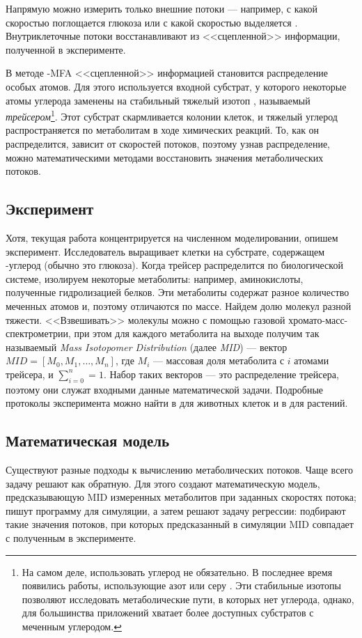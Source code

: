 \documentclass[a4paper, 12pt, left=30mm, right=15mm, top=20mm, bottom=20mm]{report}
\begin{document}
Напрямую можно измерить только внешние потоки --- например, с какой скоростью поглощается глюкоза или с какой скоростью выделяется . Внутриклеточные потоки восстанавливают из <<сцепленной>> информации, полученной в эксперименте. 

В методе -MFA <<сцепленной>> информацией становится распределение особых атомов. Для этого используется входной субстрат, у которого некоторые атомы углерода заменены на стабильный тяжелый изотоп , называемый \emph{трейсером}\footnote{На самом деле, использовать углерод не обязательно. В последнее время появились работы, использующие  азот \cite{nitrogen_mfa} или  серу \cite{sulfur_mfa}. Эти стабильные изотопы позволяют исследовать метаболические пути, в которых нет углерода, однако, для большинства приложений хватает более доступных субстратов с меченным углеродом.}. 
Этот субстрат скармливается колонии клеток, и тяжелый углерод распространяется по метаболитам в ходе химических реакций. То, как он распределится, зависит от скоростей потоков, поэтому узнав распределение, можно математическими методами восстановить значения метаболических потоков.

\subsection{Эксперимент}
Хотя, текущая работа концентрируется на численном моделировании, опишем эксперимент\cite[стр. 312]{protocol}. Исследователь выращивает клетки на субстрате, содержащем -углерод (обычно это глюкоза). Когда трейсер распределится по биологической системе, изолируем некоторые метаболиты: например, аминокислоты, полученные гидролизацией белков. Эти метаболиты содержат разное количество меченных атомов и, поэтому отличаются по массе. Найдем долю молекул разной тяжести. <<Взвешивать>> молекулы можно с помощью газовой хромато-масс-спектрометрии, при этом для каждого метаболита на выходе получим так называемый \emph{Mass Isotopomer Distribution} (далее \emph{MID}) --- вектор $M\!I\!D = [M_0, M_1, \ldots, M_n]$, где $M_i$ --- массовая доля метаболита с $i$ атомами трейсера, и $\sum_{i = 0}^{n} = 1$. Набор таких векторов --- это распределение трейсера, поэтому они служат входными данные математической задачи. Подробные протоколы эксперимента можно найти в \cite{protocol_animal} для животных клеток и в \cite{protocol_plant} для растений.

\subsection{Математическая модель}
Существуют разные подходы к вычислению метаболических потоков. Чаще всего задачу решают как обратную. Для этого создают математическую модель, предсказывающую MID измеренных метаболитов при заданных скоростях потока; пишут программу для симуляции, а затем решают задачу регрессии: подбирают такие значения потоков, при которых предсказанный в симуляции MID совпадает с полученным в эксперименте. 
\end{document}

